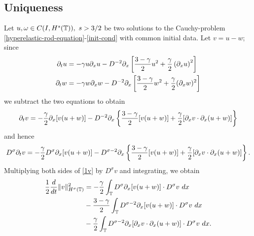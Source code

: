 \subsection{Uniqueness}
%
%
Let $u,\omega \in C(I, H^s(\mathbb{T})), \ s > 3/2$ be two solutions to the
Cauchy-problem \eqref{hyperelastic-rod-equation}-\eqref{init-cond} with
common initial data. Let $v=u-w$; since
\begin{align*}
\partial_t u 
& = - \gamma u \partial_x u - D^{-2} \partial_x \left[ \frac{3-\gamma}{2} u^2 +
\frac{\gamma}{2}\left( \partial_x u \right)^2 \right]
\\
\partial_t w & = -\gamma w \partial_x w - D^{-2} \partial_x \left[
\frac{3-\gamma}{2} w^2 + \frac{\gamma}{2}(\partial_x w)^2 
\right]
\end{align*}
we subtract the two equations to obtain 
\begin{equation*}
\begin{split}
\partial_t v
= -\frac{\gamma}{2} \partial_x [v(u + w)] - D^{-2} \partial_x \left\{
\frac{3-\gamma}{2}[v(u+w)] + \frac{\gamma}{2}[\partial_x v \cdot \partial_x (u+w)]
\right\}
\end{split}
\end{equation*}
and hence
\begin{equation}
\begin{split}
D^\sigma \partial_t v = -\frac{\gamma}{2} D^\sigma \partial_x [v(u+w)] - D^{\sigma -2} \partial_x
\left\{ \frac{3-\gamma}{2} [v(u+w)] + \frac{\gamma}{2} [\partial_x v
\cdot \partial_x
(u+w)]
\right\}.
\label{1v}
\end{split}
\end{equation}
Multiplying both sides of \eqref{1v} by $D^\sigma v$ and integrating, we obtain
\begin{equation}
\begin{split}
\frac{1}{2} \frac{d}{dt} \|v\|_{H^\sigma(\mathbb{T})}^2
& =  -\frac{\gamma}{2} \int_{\mathbb{T}} D^\sigma \partial_x [v(u+w)] \cdot
D^\sigma v \ dx
\\
& - \frac{3-\gamma}{2} \int_{\mathbb{T}}  D^{\sigma -2}
\partial_x[v(u+w)] \cdot
D^\sigma v \ dx 
\\
& - \frac{\gamma}{2} \int_{\mathbb{T}} D^{\sigma -2} \partial_x [ \partial_x v
\cdot \partial_x (u+w)]\cdot D^\sigma v \ dx.
\label{2v}
\end{split}
\end{equation}
